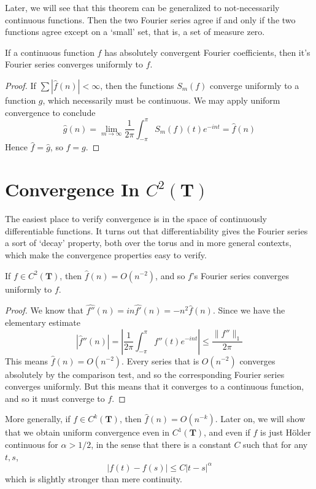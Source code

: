 Later, we will see that this theorem can be generalized to not-necessarily continuous functions. Then the two Fourier series agree if and only if the two functions agree except on a `small' set, that is, a set of measure zero.

\begin{corollary}
    If a continuous function $f$ has absolutely convergent Fourier coefficients, then it's Fourier series converges uniformly to $f$.
\end{corollary}
\begin{proof}
    If $\sum |\widehat{f}(n)| < \infty$, then the functions $S_m(f)$ converge uniformly to a function $g$, which necessarily must be continuous. We may apply uniform convergence to conclude
    \[ \hat{g}(n) = \lim_{m \to \infty} \frac{1}{2\pi} \int_{-\pi}^\pi S_m(f)(t) e^{-int} = \hat{f}(n) \]
    Hence $\hat{f} = \hat{g}$, so $f = g$.
\end{proof}

\section{Convergence In $C^2(\mathbf{T})$}

The easiest place to verify convergence is in the space of continuously differentiable functions. It turns out that differentiability gives the Fourier series a sort of `decay' property, both over the torus and in more general contexts, which make the convergence properties easy to verify.

\begin{theorem}
    If $f \in C^2(\mathbf{T})$, then $\widehat{f}(n) = O(n^{-2})$, and so $f$'s Fourier series converges uniformly to $f$.
\end{theorem}
\begin{proof}
    We know that $\widehat{f''}(n) = in \widehat{f'}(n) = -n^2 \widehat{f}(n)$. Since we have the elementary estimate
    \[ |\widehat{f}''(n)| = \left| \frac{1}{2\pi} \int_{-\pi}^\pi f''(t) e^{-int} \right| \leq \frac{\| f'' \|_1}{2\pi} \]
    This means $\widehat{f}(n) = O(n^{-2})$. Every series that is $O(n^{-2})$ converges absolutely by the comparison test, and so the corresponding Fourier series converges uniformly. But this means that it converges to a continuous function, and so it must converge to $f$.
\end{proof}

More generally, if $f \in C^k(\mathbf{T})$, then $\widehat{f}(n) = O(n^{-k})$. Later on, we will show that we obtain uniform convergence even in $C^1(\mathbf{T})$, and even if $f$ is just H\"{o}lder continuous for $\alpha > 1/2$, in the sense that there is a constant $C$ such that for any $t,s$,
%
\[ |f(t) - f(s)| \leq C|t - s|^\alpha \]
%
which is slightly stronger than mere continuity.

